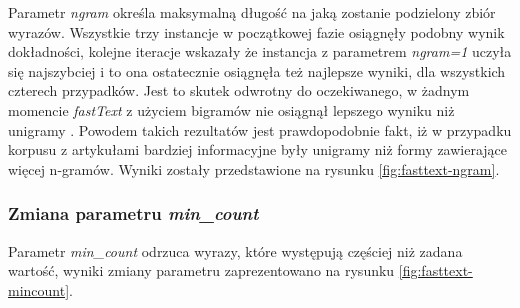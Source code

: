Parametr \textit{ngram} określa maksymalną długość na jaką zostanie podzielony zbiór wyrazów.
Wszystkie trzy instancje w początkowej fazie osiągnęły podobny wynik dokładności, kolejne iteracje wskazały że instancja z parametrem \textit{ngram=1} uczyła się najszybciej i to ona ostatecznie osiągnęła też najlepsze wyniki, dla wszystkich czterech przypadków. Jest to skutek odwrotny do oczekiwanego, w żadnym momencie \textit{fastText} z użyciem bigramów nie osiągnął lepszego wyniku niż unigramy \cite{joulin2016bag}. Powodem takich rezultatów jest prawdopodobnie fakt, iż w przypadku korpusu z artykułami bardziej informacyjne były unigramy niż formy zawierające więcej n-gramów. Wyniki zostały przedstawione na rysunku \ref{fig:fasttext-ngram}.

\subsubsection{Zmiana parametru \textit{min\_count}}
Parametr \textit{min\_count} odrzuca wyrazy, które występują częściej niż zadana wartość, wyniki zmiany parametru zaprezentowano na rysunku \ref{fig:fasttext-mincount}.



